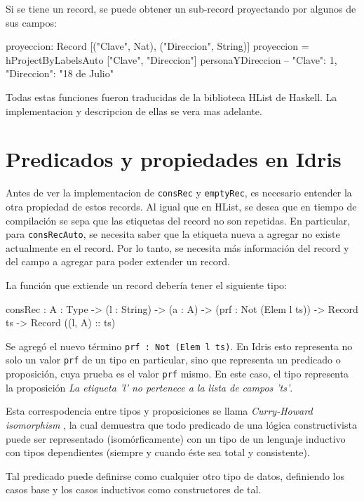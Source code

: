 Si se tiene un record, se puede obtener un sub-record proyectando por algunos de sus campos:

\begin{code}
proyeccion: Record [("Clave", Nat), ("Direccion", String)]
proyeccion = hProjectByLabelsAuto ["Clave", "Direccion"] 
  personaYDireccion
-- { "Clave": 1, "Direccion": "18 de Julio"}
\end{code}

Todas estas funciones fueron traducidas de la biblioteca HList de Haskell. La implementacion y descripcion de ellas se vera mas adelante.

\section{Predicados y propiedades en Idris}

Antes de ver la implementacion de \texttt{consRec} y \texttt{emptyRec}, es necesario entender la otra propiedad de estos records. Al igual que en HList, se desea que en tiempo de compilación se sepa que las etiquetas del record no son repetidas. En particular, para \texttt{consRecAuto}, se necesita saber que la etiqueta nueva a agregar no existe actualmente en el record. Por lo tanto, se necesita más información del record y del campo a agregar para poder extender un record.

La función que extiende un record debería tener el siguiente tipo:

\begin{code}
consRec : {A : Type} -> (l : String) -> (a : A) -> 
 (prf : Not (Elem l ts)) -> Record ts -> Record ((l, A) :: ts)
\end{code}

Se agregó el nuevo término \texttt{prf : Not (Elem l ts)}. En Idris esto representa no solo un valor \texttt{prf} de un tipo en particular, sino que representa un predicado o proposición, cuya prueba es el valor \texttt{prf} mismo. En este caso, el tipo representa la proposición \textit{La etiqueta 'l' no pertenece a la lista de campos 'ts'}.

Esta correspodencia entre tipos y proposiciones se llama \textit{Curry-Howard isomorphism} \cite{Howard80}, la cual demuestra que todo predicado de una lógica constructivista puede ser representado (isomórficamente) con un tipo de un lenguaje inductivo con tipos dependientes (siempre y cuando éste sea total y consistente).

Tal predicado puede definirse como cualquier otro tipo de datos, definiendo los casos base y los casos inductivos como constructores de tal.

